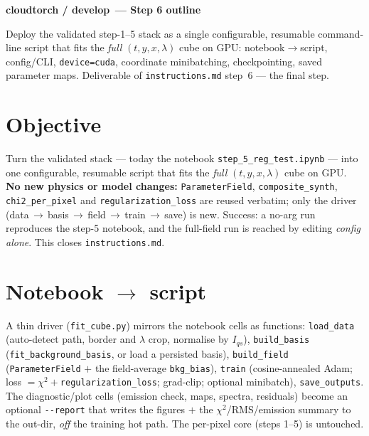 \documentclass[10pt,a4paper]{article}
\newcommand{\co}[1]{{\small\texttt{#1}}}
\begin{document}
\small

{\sffamily\bfseries\large\color{acc} cloudtorch / develop\, --- Step 6 outline}

\vspace{1pt}
{\sffamily\color{gry}\footnotesize Deploy the validated step-1--5 stack as a single configurable, resumable command-line script that fits the \emph{full} $(t,y,x,\lambda)$ cube on GPU: notebook$\rightarrow$script, config/CLI, \co{device=cuda}, coordinate minibatching, checkpointing, saved parameter maps. Deliverable of \co{instructions.md} step~6 --- the final step.}

\vspace{1pt}{\footnotesize\color{gry}\rule{\textwidth}{0.4pt}}

\section{Objective}

Turn the validated stack --- today the notebook \co{step\_5\_reg\_test.ipynb} --- into one configurable, resumable script that fits the \emph{full} $(t,y,x,\lambda)$ cube on GPU. \textbf{No new physics or model changes:} \co{ParameterField}, \co{composite\_synth}, \co{chi2\_per\_pixel} and \co{regularization\_loss} are reused verbatim; only the driver (data\,$\to$\,basis\,$\to$\,field\,$\to$\,train\,$\to$\,save) is new. Success: a no-arg run reproduces the step-5 notebook, and the full-field run is reached by editing \emph{config alone}. This closes \co{instructions.md}.

\section{Notebook $\to$ script}

A thin driver (\co{fit\_cube.py}) mirrors the notebook cells as functions: \co{load\_data} (auto-detect path, border and $\lambda$ crop, normalise by $I_{qs}$), \co{build\_basis} (\co{fit\_background\_basis}, or load a persisted basis), \co{build\_field} (\co{ParameterField} $+$ the field-average \co{bkg\_bias}), \co{train} (cosine-annealed Adam; loss $=\chi^2+$\co{regularization\_loss}; grad-clip; optional minibatch), \co{save\_outputs}. The diagnostic/plot cells (emission check, maps, spectra, residuals) become an optional \co{-{}-report} that writes the figures $+$ the $\chi^2$/RMS/emission summary to the out-dir, \emph{off} the training hot path. The per-pixel core (steps 1--5) is untouched.
\end{document}
